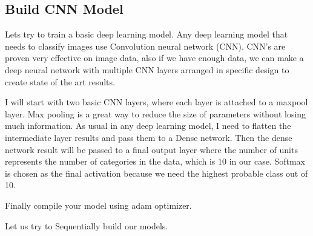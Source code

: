 \documentclass[11pt]{article}
\begin{document}
    \hypertarget{build-cnn-model}{%
\subsection{Build CNN Model}\label{build-cnn-model}}

Lets try to train a basic deep learning model. Any deep learning model
that needs to classify images use Convolution neural network (CNN).
CNN's are proven very effective on image data, also if we have enough
data, we can make a deep neural network with multiple CNN layers
arranged in specific design to create state of the art results.

I will start with two basic CNN layers, where each layer is attached to
a maxpool layer. Max pooling is a great way to reduce the size of
parameters without losing much information. As usual in any deep
learning model, I need to flatten the intermediate layer results and
pass them to a Dense network. Then the dense network result will be
passed to a final output layer where the number of units represents the
number of categories in the data, which is 10 in our case. Softmax is
chosen as the final activation because we need the highest probable
class out of 10.

Finally compile your model using adam optimizer.

Let us try to Sequentially build our models.
\end{document}

